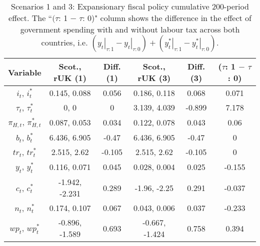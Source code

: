 \begin{table}[H]
\centering
\begin{tabular}{cccccc}
  \hline
{\textbf{Variable}} & {\textbf{Scot., rUK (1)}} & {\textbf{Diff. (1)}} & {\textbf{Scot., rUK (3)}} & {\textbf{Diff. (3)}} & {\textbf{($\tau$: 1 $-$ $\tau$: 0)}} \\ 
  \hline
${i_t}$, ${i^*_t}$ & 0.145, 0.088 & 0.056 & 0.186, 0.118 & 0.068 & 0.071 \\ 
  ${\tau_t}$, ${\tau^*_t}$ & 0, 0 & 0 & 3.139, 4.039 & -0.899 & 7.178 \\ 
  ${\pi_{H,t}}$, ${\pi^*_{H,t}}$ & 0.087, 0.053 & 0.034 & 0.122, 0.078 & 0.043 & 0.06 \\ 
  ${b_t}$, ${b^*_t}$ & 6.436, 6.905 & -0.47 & 6.436, 6.905 & -0.47 & 0 \\ 
  ${tr_t}$, ${tr^*_t}$ & 2.515, 2.62 & -0.105 & 2.515, 2.62 & -0.105 & 0 \\ 
  ${y_t}$, ${y^*_t}$ & 0.116, 0.071 & 0.045 & 0.028, 0.004 & 0.025 & -0.155 \\ 
  ${c_t}$, ${c^*_t}$ & -1.942, -2.231 & 0.289 & -1.96, -2.25 & 0.291 & -0.037 \\ 
  ${n_t}$, ${n^*_t}$ & 0.174, 0.107 & 0.067 & 0.043, 0.006 & 0.037 & -0.233 \\ 
  ${wp_t}$, ${wp^*_t}$ & -0.896, -1.589 & 0.693 & -0.667, -1.424 & 0.758 & 0.394 \\ 
   \hline
\end{tabular}
\caption{Scenarios 1 and 3: Expansionary fiscal policy cumulative 200-period effect. The ``$(\tau$: 1 $-$ $\tau$: 0)" column shows the difference in the effect of government spending with and without labour tax across both countries, i.e. $(\left. y_t \right|_{\tau:1} - \left. y_t \right|_{\tau:0}) + (\left. y^*_t \right|_{\tau:1} - \left. y^*_t \right|_{\tau:0})$.} 
\label{table:responses_one_three}
\end{table}
